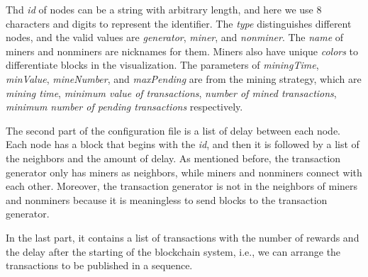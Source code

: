 Thd \textit{id} of nodes can be a string with arbitrary length, and here we use 8 characters and digits to represent the identifier. The \textit{type} distinguishes different nodes, and the valid values are \textit{generator}, \textit{miner}, and \textit{nonminer}. The \textit{name} of miners and nonminers are nicknames for them. Miners also have unique \textit{colors} to differentiate blocks in the visualization. The parameters of \textit{miningTime}, \textit{minValue}, \textit{mineNumber}, and \textit{maxPending} are from the mining strategy, which are \textit{mining time}, \textit{minimum value of transactions}, \textit{number of mined transactions}, \textit{minimum number of pending transactions} respectively.

The second part of the configuration file is a list of delay between each node. Each node has a block that begins with the \textit{id}, and then it is followed by a list of the neighbors and the amount of delay. As mentioned before, the transaction generator only has miners as neighbors, while miners and nonminers connect with each other. Moreover, the transaction generator is not in the neighbors of miners and nonminers because it is meaningless to send blocks to the transaction generator.

In the last part, it contains a list of transactions with the number of rewards and the delay after the starting of the blockchain system, i.e., we can arrange the transactions to be published in a sequence.

